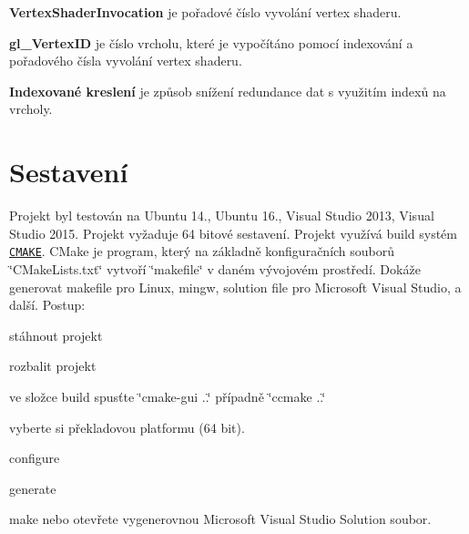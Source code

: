 {\bfseries Vertex\-Shader\-Invocation} je pořadové číslo vyvolání vertex shaderu.

{\bfseries gl\-\_\-\-Vertex\-I\-D} je číslo vrcholu, které je vypočítáno pomocí indexování a pořadového čísla vyvolání vertex shaderu.

{\bfseries Indexované kreslení} je způsob snížení redundance dat s využitím indexů na vrcholy. \hypertarget{index_sestaveni}{}\section{Sestavení}\label{index_sestaveni}
Projekt byl testován na Ubuntu 14., Ubuntu 16., Visual Studio 2013, Visual Studio 2015. Projekt vyžaduje 64 bitové sestavení. Projekt využívá build systém \href{https://cmake.org/}{\tt C\-M\-A\-K\-E}. C\-Make je program, který na základně konfiguračních souborů \char`\"{}\-C\-Make\-Lists.\-txt\char`\"{} vytvoří \char`\"{}makefile\char`\"{} v daném vývojovém prostředí. Dokáže generovat makefile pro Linux, mingw, solution file pro Microsoft Visual Studio, a další. Postup\-:
\begin{DoxyEnumerate}
\item stáhnout projekt
\item rozbalit projekt
\item ve složce build spusťte \char`\"{}cmake-\/gui ..\char`\"{} případně \char`\"{}ccmake ..\char`\"{}
\item vyberte si překladovou platformu (64 bit).
\item configure
\item generate
\item make nebo otevřete vygenerovnou Microsoft Visual Studio Solution soubor.
\end{DoxyEnumerate}


